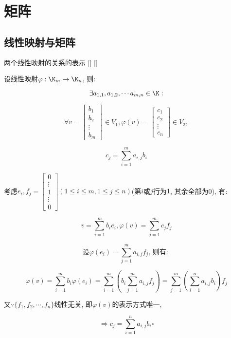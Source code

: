 \documentclass[UTF8]{ctexart}
\begin{document}
\section{矩阵}
	
	\subsection{线性映射与矩阵}
		\begin{thm}
			[]
			{两个线性映射的关系的表示}
			[]
			[]

			设线性映射$\varphi:\K_m\to \K_n$, 则: 
			
			$$\exists a_{1,1},a_{1,2},\cdots a_{m,n}\in\K: $$
			
			$$\forall v=\begin{bmatrix}b_1\\b_2\\\vdots\\b_m\end{bmatrix}\in V_1, \varphi(v)=\begin{bmatrix}c_1\\c_2\\\vdots\\c_n\end{bmatrix}\in V_2, $$
			
			$$c_j=\sum_{i=1}^{m}a_{i,j}b_i$$
		\end{thm}
  
		\begin{prf}
			考虑$e_i,f_j=\begin{bmatrix}0\\\vdots\\1\\\vdots\\0\end{bmatrix}(1\leq i\leq m, 1\leq j\leq n)$(第$i$或$j$行为$1$, 其余全部为0), 有: 
			
			$$v=\sum_{i=1}^{m}b_{i}e_i, \varphi(v)=\sum_{j=1}^{m}c_{j}f_j$$
			
			$$\mbox{设}\varphi(e_i)=\sum_{j=1}^{m}a_{i,j}f_j\mbox{, 则有: }$$
			
			$$\varphi(v)=\sum_{i=1}^{m}b_{i}\varphi(e_i)=\sum_{i=1}^{m}(b_{i}\sum_{j=1}^{m}a_{i,j}f_j)=\sum_{j=1}^{m}(\sum_{i=1}^{n}a_{i,j}b_i)f_j$$
			
			又$\because\{f_1,f_2,\cdots,f_n\}$线性无关, 即$\varphi(v)$的表示方式唯一, 
			
			$$\Longrightarrow c_j=\sum_{i=1}^{n}a_{i,j}b_i\square$$
		\end{prf}
  
\end{document}
